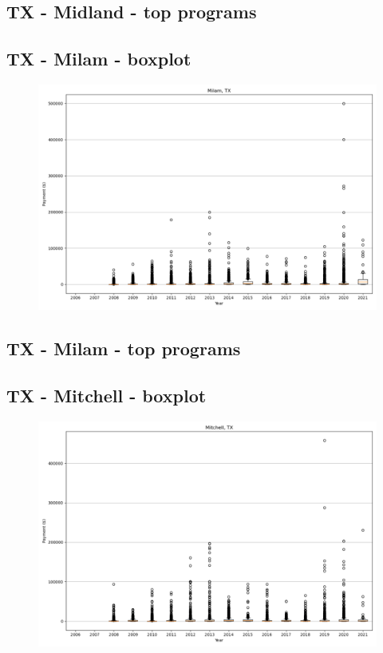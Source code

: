 \subsection*{TX - Midland - top programs}

\newpage
\subsection*{TX - Milam - boxplot}
\begin{figure}[h]
\centering
\includegraphics[width=7in]{../output/boxplots/counties/Milam-TX_boxplot.png}
\end{figure}


\subsection*{TX - Milam - top programs}

\newpage
\subsection*{TX - Mitchell - boxplot}
\begin{figure}[h]
\centering
\includegraphics[width=7in]{../output/boxplots/counties/Mitchell-TX_boxplot.png}
\end{figure}


